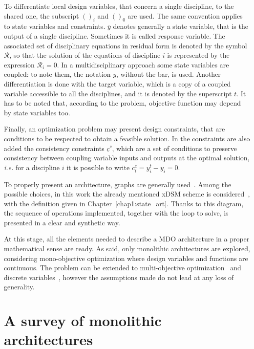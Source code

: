To differentiate local design variables, that concern a single discipline, to the shared one, the subscript $()_i$ and $()_0$ are used. 
The same convention applies to state variables and constraints. 
$\bar{y}$ denotes generally a state variable, that is the output of a single discipline.
Sometimes it is called response variable. 
The associated set of disciplinary equations in residual form is denoted by the symbol $\mathcal{R}$, so that the solution of the equations of discipline $i$ is represented by the expression $\mathcal{R}_i=0$.
In a multidisciplinary approach some state variables are coupled: to note them, the notation $y$, without the bar, is used. 
Another differentiation is done with the target variable, which is a copy of a coupled variable accessible to all the disciplines, and it is denoted by the superscript $t$.
It has to be noted that, according to the problem, objective function may depend by state variables too. 

Finally, an optimization problem may present design constraints, that are conditions to be respected to obtain a feasible solution. 
In the constraints are also added the consistency constraints $\underline{c}^c$, which are a set of conditions to preserve consistency between coupling variable inputs and outputs at the optimal solution, \textit{i.e.} for a discipline $i$ it is possible to write $c_i^c=y_i^t-y_i=0$. 

To properly present an architecture, graphs are generally used~\cite{bib:aigner}. Among the possible choices, in this work the already mentioned xDSM scheme is considered~\cite{bib:lambe_xdsm}, with the definition given in Chapter~\ref{chap1:state_art}. 
Thanks to this diagram, the sequence of operations implemented, together with the loop to solve, is presented in a clear and synthetic way. 

At this stage, all the elements needed to describe a MDO architecture in a proper mathematical sense are ready. 
As said, only monolithic architectures are explored, considering mono-objective optimization where design variables and functions are continuous. 
The problem can be extended to multi-objective optimization~\cite{bib:miettinen, bib:lewis} and discrete variables~\cite{bib:belotti}, however the assumptions made do not lead at any loss of generality. 

\section{A survey of monolithic architectures}
\label{sec:app2_monolithic_arch}

